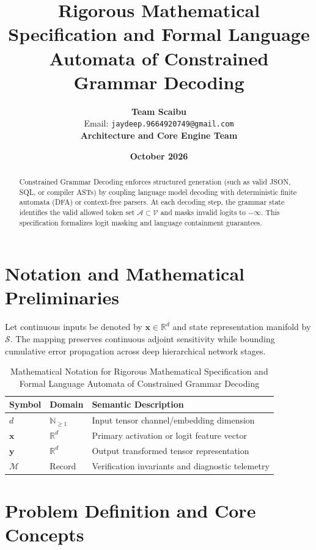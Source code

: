 \documentclass[11pt,a4paper]{article}
\title{\textbf{Rigorous Mathematical Specification and Formal Language Automata of Constrained Grammar Decoding}}
\author{\textbf{Team Scaibu} \\ \small Email: \texttt{jaydeep.9664920749@gmail.com} \\ \small \textbf{Architecture and Core Engine Team}}
\date{\textbf{October 2026}}
\theoremstyle{definition}
\begin{document}
\maketitle

\begin{abstract}
Constrained Grammar Decoding enforces structured generation (such as valid JSON, SQL, or compiler ASTs) by coupling language model decoding with deterministic finite automata (DFA) or context-free parsers. At each decoding step, the grammar state identifies the valid allowed token set $\mathcal{A} \subset \mathcal{V}$ and masks invalid logits to $-\infty$. This specification formalizes logit masking and language containment guarantees.
\end{abstract}

\section{Notation and Mathematical Preliminaries}

Let continuous inputs be denoted by $\mathbf{x} \in \mathbb{R}^d$ and state representation manifold by $\mathcal{S}$. The mapping preserves continuous adjoint sensitivity while bounding cumulative error propagation across deep hierarchical network stages.

\begin{table}[h]
\centering
\caption{Mathematical Notation for Rigorous Mathematical Specification and Formal Language Automata of Constrained Grammar Decoding}
\begin{tabular}{lll}
\toprule
\textbf{Symbol} & \textbf{Domain} & \textbf{Semantic Description} \\
\midrule
$d$ & $\mathbb{N}_{\ge 1}$ & Input tensor channel/embedding dimension \\
$\mathbf{x}$ & $\mathbb{R}^d$ & Primary activation or logit feature vector \\
$\mathbf{y}$ & $\mathbb{R}^d$ & Output transformed tensor representation \\
$\mathcal{M}$ & Record & Verification invariants and diagnostic telemetry \\
\bottomrule
\end{tabular}
\end{table}

\section{Problem Definition and Core Concepts}
\end{document}
